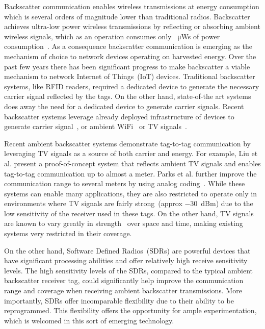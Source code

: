 Backscatter communication enables wireless transmissions
at energy consumption which is several orders of magnitude
lower than traditional radios. Backscatter achieves ultra-low
power wireless transmissions by reflecting or absorbing ambient
wireless signals, which as an operation consumes only 
\SI{}{\micro\watt}s of power consumption~\cite{liu_ambient_2013}. 
As a consequence backscatter
communication is emerging as the mechanism of choice to network
devices operating on harvested energy.  
Over the past few years there has been significant progress
to make backscatter a viable mechanism to network Internet of
Things~(IoT) devices. Traditional backscatter systems, like RFID readers, required a
dedicated device to generate the necessary carrier signal
reflected by the tags. On the other hand, state-of-the art systems 
does away the need for a dedicated device to generate carrier signals. 
Recent backscatter systems leverage already deployed infrastructure of
devices to generate carrier signal~\cite{varshney2016lorea,iyer2016inter}, or ambient WiFi~\cite{zhang2016hitchhike,kellogg2015wi} or TV
signals~\cite{liu_ambient_2013,parks_turbocharging_2014}.

Recent ambient backscatter systems demonstrate tag-to-tag communication
by leveraging TV signals as a source of both carrier and energy. For
example, Liu et al. present a proof-of-concept system that reflects
ambient TV signals and enables tag-to-tag communication up to almost a
meter. Parks et al. further improve the communication range to several
meters by using analog coding~\cite{parks_turbocharging_2014}. While
these systems can enable many applications, they are also restricted to
operate only in environments where TV signals are fairly strong~(approx
\SI{-30}{dBm}) due to the low sensitivity of the receiver used in these
tags. On the other hand, TV signals are known to vary greatly in
strength~\cite{wang_fm_2017} over space and time, making existing
systems very restricted in their coverage.

On the other hand, Software Defined Radios~(SDRs) are powerful devices
that have significant processing abilities and offer relatively high
receive sensitivity levels. The high sensitivity levels of the SDRs,
compared to the typical ambient backscatter receiver tag, could
significantly help improve the communication range and coverage when
receiving ambient backscatter transmissions. More importantly, SDRs
offer incomparable flexibility due to their ability to be reprogrammed.
This flexibility offers the opportunity for ample experimentation, which
is welcomed in this sort of emerging technology.

